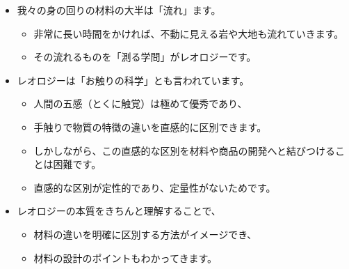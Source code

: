 \documentclass[unicode,10pt]{beamer}
\begin{document}
\begin{frame}[plain]
	\begin{itemize}
		\item 我々の身の回りの材料の大半は「流れ」ます。
			\begin{itemize}
				\item 非常に長い時間をかければ、不動に見える岩や大地も流れていきます。
				\item その流れるものを「測る学問」がレオロジーです。
			\end{itemize}
		\item レオロジーは「お触りの科学」とも言われています。
			\begin{itemize}
				\item 人間の五感（とくに触覚）は極めて優秀であり、
				\item 手触りで物質の特徴の違いを直感的に区別できます。
				\item しかしながら、この直感的な区別を材料や商品の開発へと結びつけることは困難です。
				\item 直感的な区別が定性的であり、定量性がないためです。
			\end{itemize}
		\item レオロジーの本質をきちんと理解することで、
			\begin{itemize}
				\item 材料の違いを明確に区別する方法がイメージでき、
				\item 材料の設計のポイントもわかってきます。
			\end{itemize}
	\end{itemize}
\end{frame}

\end{document}
